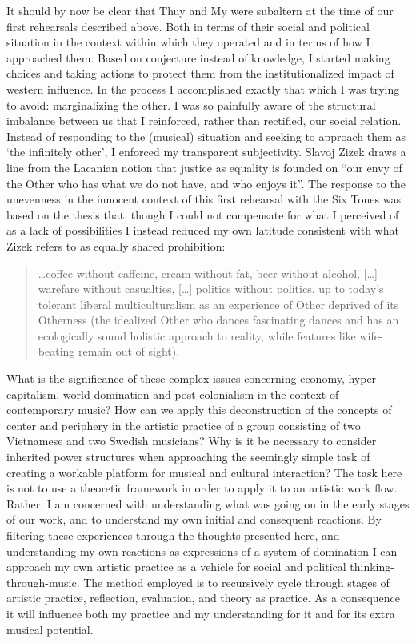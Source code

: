 \documentclass[a4paper]{article}
\begin{document}
It should by now be clear that Thuy and My were subaltern at the time of our first rehearsals described above. Both in terms of their social and political situation in the context within which they operated and in terms of how I approached them. Based on conjecture instead of knowledge, I started making choices and taking actions to protect them from the institutionalized impact of western influence. In the process I accomplished exactly that which I was trying to avoid: marginalizing the other. I was so painfully aware of the structural imbalance between us that I reinforced, rather than rectified, our social relation. Instead of responding to the (musical) situation and seeking to approach them as `the infinitely other', I enforced my transparent subjectivity. Slavoj Zizek draws a line from the Lacanian notion that justice as equality is founded on ``our envy of the Other who has what we do not have, and who enjoys it''. The response to the unevenness in the innocent context of this first rehearsal with the Six Tones was based on the thesis that, though I could not compensate for what I perceived of as a lack of possibilities I instead reduced my own latitude consistent with what Zizek refers to as equally shared prohibition:

\begin{quote}
  \ldots coffee without caffeine, cream without fat, beer without alcohol, [\ldots] warefare without casualties, [\ldots] politics without politics, up to today's tolerant liberal multiculturalism as an experience of Other deprived of its Otherness (the idealized Other who dances fascinating dances and has an ecologically sound holistic approach to reality, while features like wife-beating remain out of sight).
\end{quote}

What is the significance of these complex issues concerning economy, hyper-capitalism, world domination and post-colonialism in the context of contemporary music? How can we apply this deconstruction of the concepts of center and periphery in the artistic practice of a group consisting of two Vietnamese and two Swedish musicians? Why is it be necessary to consider inherited power structures when approaching the seemingly simple task of creating a workable platform for musical and cultural interaction? The task here is not to use a theoretic framework in order to apply it to an artistic work flow. Rather, I am concerned with understanding what was going on in the early stages of our work, and to understand my own initial and consequent reactions. By filtering these experiences through the thoughts presented here, and understanding my own reactions as expressions of a system of domination I can approach my own artistic practice as a vehicle for social and political thinking-through-music. The method employed is to recursively cycle through stages of artistic practice, reflection, evaluation, and theory as practice. As a consequence it will influence both my practice and my understanding for it and for its extra musical potential. 
\end{document}
